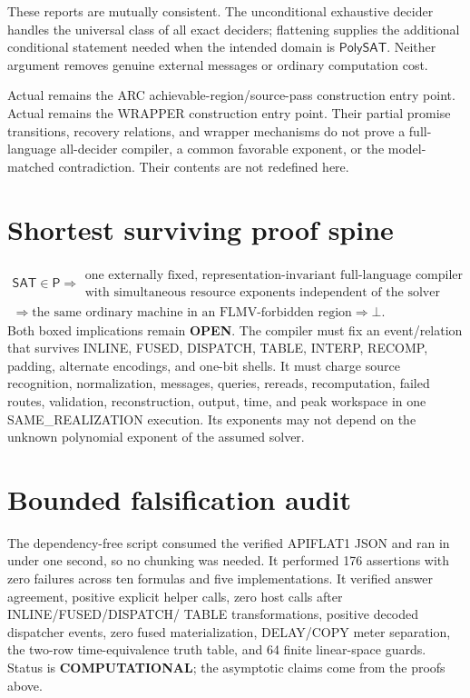 \documentclass[11pt]{article}
\newcommand{\SAT}{\mathsf{SAT}}
\newcommand{\COMP}{\textbf{COMPUTATIONAL}}
\newcommand{\OPEN}{\textbf{OPEN}}
\begin{document}
These reports are mutually consistent.  The unconditional exhaustive decider
handles the universal class of all exact deciders; flattening supplies the
additional conditional statement needed when the intended domain is
$\mathsf{PolySAT}$.  Neither argument removes genuine external messages or
ordinary computation cost.

Actual  remains the ARC achievable-region/source-pass
construction entry point.  Actual  remains the WRAPPER
construction entry point.  Their partial promise transitions, recovery
relations, and wrapper mechanisms do not prove a full-language all-decider
compiler, a common favorable exponent, or the model-matched contradiction.
Their contents are not redefined here.

\section{Shortest surviving proof spine}
\[
\begin{gathered}
\SAT\in\mathsf P
\Longrightarrow
\boxed{\begin{array}{c}
\text{one externally fixed, representation-invariant full-language compiler}\\
\text{with simultaneous resource exponents independent of the solver}
\end{array}}\\
\Longrightarrow
\boxed{\text{the same ordinary machine in an FLMV-forbidden region}}
\Longrightarrow\bot.
\end{gathered}
\]
Both boxed implications remain \OPEN.  The compiler must fix an event/relation
that survives INLINE, FUSED, DISPATCH, TABLE, INTERP, RECOMP, padding,
alternate encodings, and one-bit shells.  It must charge source recognition,
normalization, messages, queries, rereads, recomputation, failed routes,
validation, reconstruction, output, time, and peak workspace in one
SAME\_REALIZATION execution.  Its exponents may not depend on the unknown
polynomial exponent of the assumed solver.

\section{Bounded falsification audit}
The dependency-free script
consumed the verified APIFLAT1 JSON and ran in under one second, so no
chunking was needed.  It performed 176 assertions with zero failures across
ten formulas and five implementations.  It verified answer agreement,
positive explicit helper calls, zero host calls after INLINE/FUSED/DISPATCH/
TABLE transformations, positive decoded dispatcher events, zero fused
materialization, DELAY/COPY meter separation, the two-row time-equivalence
truth table, and 64 finite linear-space guards.  Status is \COMP; the
asymptotic claims come from the proofs above.
\end{document}
